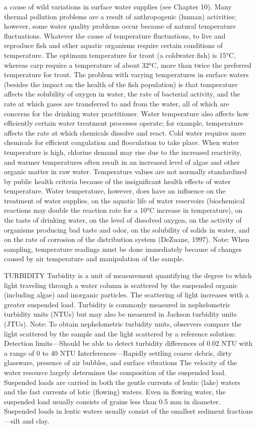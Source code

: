\documentclass{article}
\begin{document}
a cause of wild variations in surface water supplies (see Chapter 10).
Many thermal pollution problems are a result of anthropogenic (human)
activities; however, some water quality problems occur because of
natural temperature fluctuations. Whatever the cause of temperature
fluctuations, to live and reproduce fish and other aquatic organisms
require certain conditions of temperature. The optimum temperature for
trout (a coldwater fish) is 15°C, whereas carp require a temperature of
about 32°C, more than twice the preferred temperature for trout. The
problem with varying temperatures in surface waters (besides the impact
on the health of the fish population) is that temperature affects the
solubility of oxygen in water, the rate of bacterial activity, and the
rate at which gases are transferred to and from the water, all of which
are concerns for the drinking water practitioner. Water temperature also
affects how efficiently certain water treatment processes operate; for
example, temperature affects the rate at which chemicals dissolve and
react. Cold water requires more chemicals for efficient coagulation and
flocculation to take place. When water temperature is high, chlorine
demand may rise due to the increased reactivity, and warmer temperatures
often result in an increased level of algae and other organic matter in
raw water. Temperature values are not normally standardized by public
health criteria because of the insignificant health effects of water
temperature. Water temperature, however, does have an influence on the
treatment of water supplies, on the aquatic life of water reservoirs
(biochemical reactions may double the reaction rate for a 10°C increase
in temperature), on the taste of drinking water, on the level of
dissolved oxygen, on the activity of organisms producing bad taste and
odor, on the solubility of solids in water, and on the rate of corrosion
of the distribution system (DeZuane, 1997). Note: When sampling,
temperature readings must be done immediately because of changes caused
by air temperature and manipulation of the sample.

TURBIDITY Turbidity is a unit of measurement quantifying the degree to
which light traveling through a water column is scattered by the
suspended organic (including algae) and inorganic particles. The
scattering of light increases with a greater suspended load. Turbidity
is commonly measured in nephelometric turbidity units (NTUs) but may
also be measured in Jackson turbidity units (JTUs). Note: To obtain
nephelometric turbidity units, observers compare the light scattered by
the sample and the light scattered by a reference solution: Detection
limits---Should be able to detect turbidity differences of 0.02 NTU with
a range of 0 to 40 NTU Interferences---Rapidly settling coarse debris,
dirty glassware, presence of air bubbles, and surface vibrations The
velocity of the water resource largely determines the composition of the
suspended load. Suspended loads are carried in both the gentle currents
of lentic (lake) waters and the fast currents of lotic (flowing) waters.
Even in flowing water, the suspended load usually consists of grains
less than 0.5 mm in diameter. Suspended loads in lentic waters usually
consist of the smallest sediment fractions---silt and clay.
\end{document}
